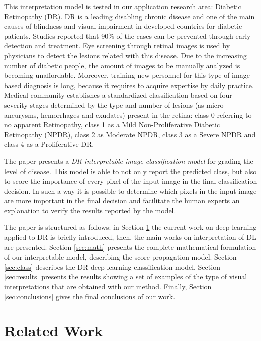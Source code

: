 \documentclass[preprint]{elsarticle}
\theoremstyle{definition} %
\theoremstyle{remark}
\begin{document}
This interpretation model is tested in our application research area: Diabetic Retinopathy (DR). DR is a leading disabling chronic disease  and  one of the main causes of blindness and visual impairment in developed countries for diabetic patients. Studies reported that 90\% of the cases can be prevented through early detection and treatment. Eye screening through retinal images is used by physicians to detect the lesions related with this disease. Due to the increasing number of diabetic people, the amount of images to be manually analyzed is becoming unaffordable. Moreover, training new personnel for this type of image-based diagnosis is long, because it requires to acquire expertise by daily practice. Medical community establishes a standardized classification based on four severity stages \cite{diaclass} determined by the type and number of lesions (as micro-aneurysms, hemorrhages and exudates) present in the retina: class 0 referring to no apparent Retinopathy, class 1 as a Mild Non-Proliferative Diabetic Retinopathy (NPDR), class 2 as Moderate NPDR, class 3 as a Severe NPDR and class 4 as a Proliferative DR. 

The paper presents a \emph{DR interpretable image classification model} for grading the level of disease. This model is able to not only report the predicted class, but also to score the importance of every pixel of the input image in the final classification decision. In such a way it is possible to determine which pixels in the input image are more important in the final decision and facilitate the human experts an explanation to verify the results reported by the model.

The paper is structured as follows: in Section \ref{sec:related} the current work on deep learning applied to DR is briefly introduced, then, the main works on interpretation of DL are presented. Section \ref{sec:math} presents the complete mathematical formulation of our interpretable model, describing the score propagation model. Section \ref{sec:class} describes the DR deep learning classification model. Section \ref{sec:results} presents the results showing a set of examples of the type of visual interpretations that are obtained with our method. Finally, Section \ref{sec:conclusions} gives the final conclusions of our work.


\section{Related Work}\label{sec:related}
\end{document}
